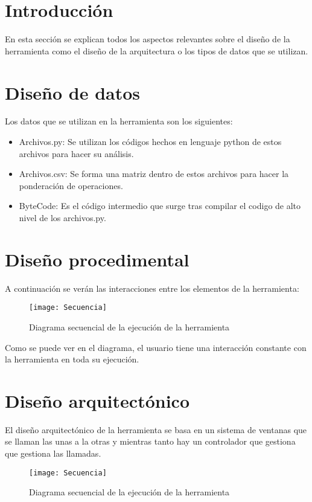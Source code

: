
\section{Introducción}
En esta sección se explican todos los aspectos relevantes sobre el diseño de la herramienta como el diseño de la arquitectura o los tipos de datos que se utilizan.

\section{Diseño de datos}
Los datos que se utilizan en la herramienta son los siguientes:
\begin{itemize}
	\item Archivos.py: Se utilizan los códigos hechos en lenguaje python de estos archivos para hacer su análisis.
	\item Archivos.csv: Se forma una matriz dentro de estos archivos para hacer la ponderación de operaciones. 
	\item ByteCode: Es el código intermedio que surge tras compilar el codigo de alto  nivel de los archivos.py.
	
\end{itemize}


\section{Diseño procedimental}
A continuación se verán las interacciones entre los elementos de la herramienta:

\begin{figure}[H]
\centering
\texttt{[image: Secuencia]}
\caption{Diagrama secuencial de la ejecución de la herramienta}
\end{figure}



Como se puede ver en el diagrama, el usuario tiene una interacción constante con la herramienta en toda su ejecución.
\section{Diseño arquitectónico}
El diseño arquitectónico de la herramienta se basa en un sistema de ventanas que se llaman las unas a la otras y mientras  tanto hay un controlador que gestiona que gestiona las llamadas.

\begin{figure}[H]
\centering
\texttt{[image: Secuencia]}
\caption{Diagrama secuencial de la ejecución de la herramienta}
\end{figure}
